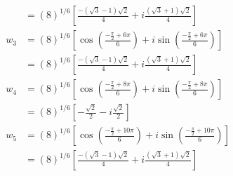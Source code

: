 \documentclass[a4paper,12pt]{article}
\begin{document}
\begin{enumerate}
\begin{align}
        &=(8)^{1/6}\left[\frac{-(\sqrt{3}-1)\sqrt{2}}{4}+i\frac{(\sqrt{3}+1)\sqrt{2}}{4}\right]\\
        w_3 &=(8)^{1/6}\left[\cos\left(\frac{-\frac{\pi}{2}+6\pi}{6} \right)+i\sin\left(\frac{-\frac{\pi}{2}+6\pi}{6} \right) \right]\\
        &=(8)^{1/6}\left[\frac{-(\sqrt{3}-1)\sqrt{2}}{4}+i\frac{(\sqrt{3}+1)\sqrt{2}}{4}\right]\\
        w_4 &=(8)^{1/6}\left[\cos\left(\frac{-\frac{\pi}{2}+8\pi}{6} \right)+i\sin\left(\frac{-\frac{\pi}{2}+8\pi}{6} \right) \right]\\
        &=(8)^{1/6}\left[-\frac{\sqrt{2}}{2}-i\frac{\sqrt{2}}{2}\right]\\
        w_5 &=(8)^{1/6}\left[\cos\left(\frac{-\frac{\pi}{2}+10\pi}{6} \right)+i\sin\left(\frac{-\frac{\pi}{2}+10\pi}{6} \right) \right]\\
        &=(8)^{1/6}\left[\frac{-(\sqrt{3}-1)\sqrt{2}}{4}+i\frac{(\sqrt{3}+1)\sqrt{2}}{4}\right]
    \end{align}
\end{enumerate}
\end{document}
